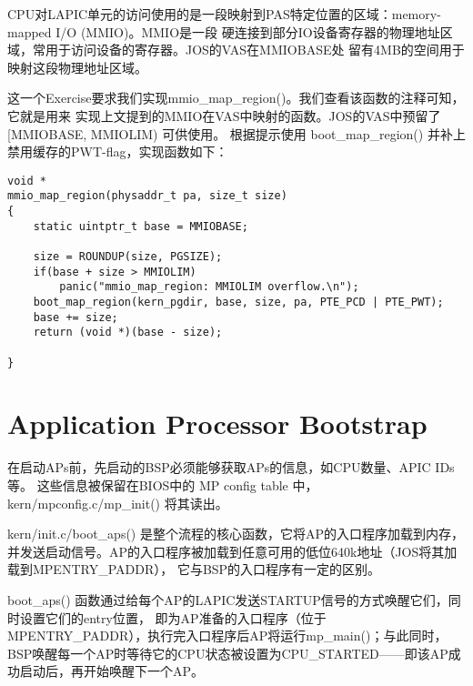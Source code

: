 \documentclass[12pt, letterpaper]{report}
\begin{document}
CPU对LAPIC单元的访问使用的是一段映射到PAS特定位置的区域：memory-mapped I/O (MMIO)。MMIO是一段
硬连接到部分IO设备寄存器的物理地址区域，常用于访问设备的寄存器。JOS的VAS在MMIOBASE处
留有4MB的空间用于映射这段物理地址区域。\par
\newpage
{}
\quad \par
这一个Exercise要求我们实现mmio\_map\_region()。我们查看该函数的注释可知，它就是用来
实现上文提到的MMIO在VAS中映射的函数。JOS的VAS中预留了 [MMIOBASE, MMIOLIM) 可供使用。
根据提示使用 boot\_map\_region() 并补上禁用缓存的PWT-flag，实现函数如下：\par 
\lstset{style=CStyle}
\setmainfont{Consolas}
\begin{lstlisting}
void *
mmio_map_region(physaddr_t pa, size_t size)
{
    static uintptr_t base = MMIOBASE;

    size = ROUNDUP(size, PGSIZE);
    if(base + size > MMIOLIM)
        panic("mmio_map_region: MMIOLIM overflow.\n");
    boot_map_region(kern_pgdir, base, size, pa, PTE_PCD | PTE_PWT);
    base += size;
    return (void *)(base - size);
    
}
\end{lstlisting}
\setmainfont{Times New Roman}

\section[\large Application Processor Bootstrap]{Application Processor Bootstrap}
在启动APs前，先启动的BSP必须能够获取APs的信息，如CPU数量、APIC IDs等。
这些信息被保留在BIOS中的 MP config table 中，kern/mpconfig.c/mp\_init() 
将其读出。\par 
kern/init.c/boot\_aps() 是整个流程的核心函数，它将AP的入口程序加载到内存，
并发送启动信号。AP的入口程序被加载到任意可用的低位640k地址（JOS将其加载到MPENTRY\_PADDR），
它与BSP的入口程序有一定的区别。 \par 
boot\_aps() 函数通过给每个AP的LAPIC发送STARTUP信号的方式唤醒它们，同时设置它们的entry位置，
即为AP准备的入口程序（位于MPENTRY\_PADDR），执行完入口程序后AP将运行mp\_main()；与此同时，
BSP唤醒每一个AP时等待它的CPU状态被设置为CPU\_STARTED——即该AP成功启动后，再开始唤醒下一个AP。\par 
\end{document}

